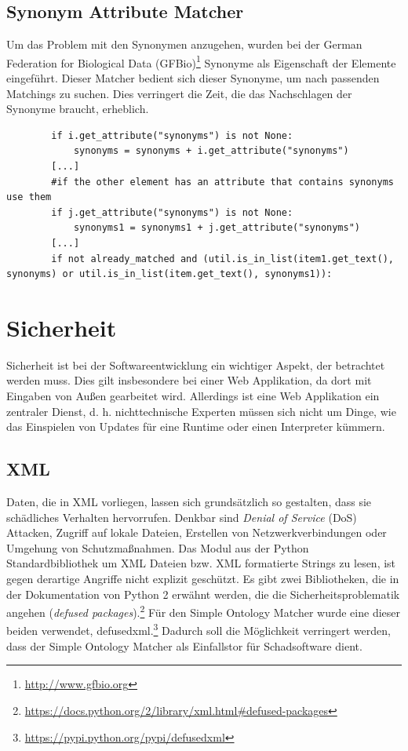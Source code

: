 		\subsection{Synonym Attribute Matcher}
		Um das Problem mit den Synonymen anzugehen, wurden bei der German Federation
		for Biological Data (GFBio)\footnote{\url{http://www.gfbio.org}} Synonyme als
		Eigenschaft der Elemente eingeführt. Dieser Matcher bedient sich dieser
		Synonyme, um nach passenden Matchings zu suchen. Dies verringert die Zeit, die
		das Nachschlagen der Synonyme braucht, erheblich.
		\begin{lstlisting}
		if i.get_attribute("synonyms") is not None:
            synonyms = synonyms + i.get_attribute("synonyms")
        [...]
        #if the other element has an attribute that contains synonyms use them
        if j.get_attribute("synonyms") is not None:
            synonyms1 = synonyms1 + j.get_attribute("synonyms")
        [...]
        if not already_matched and (util.is_in_list(item1.get_text(), synonyms) or util.is_in_list(item.get_text(), synonyms1)):
		\end{lstlisting}
		
		\section{Sicherheit}
		\label{Sicherheit}
		Sicherheit ist bei der Softwareentwicklung ein wichtiger Aspekt, der
		betrachtet werden muss. Dies gilt insbesondere bei einer Web Applikation, da
		dort mit Eingaben von Außen gearbeitet wird. Allerdings ist eine Web
		Applikation ein zentraler Dienst, d. h. nichttechnische Experten müssen sich
		nicht um Dinge, wie das Einspielen von Updates für eine Runtime oder einen
		Interpreter kümmern.
		
		\subsection{XML}
		Daten, die in XML vorliegen, lassen sich grundsätzlich so gestalten, dass sie
		schädliches Verhalten hervorrufen. Denkbar sind
		\textit{Denial of Service} (DoS) Attacken, Zugriff auf lokale Dateien,
		Erstellen von Netzwerkverbindungen oder Umgehung von
		Schutzmaßnahmen.\cite{defusedxml}
		Das Modul aus der Python Standardbibliothek um XML Dateien bzw. XML
		formatierte Strings zu lesen, ist gegen derartige Angriffe nicht explizit
		geschützt. Es gibt zwei Bibliotheken, die in der Dokumentation von Python 2
		erwähnt werden, die die Sicherheitsproblematik angehen (\textit{defused
		packages}).\footnote{\url{https://docs.python.org/2/library/xml.html#defused-packages}}
		Für den Simple Ontology Matcher wurde eine dieser beiden verwendet, defusedxml.\footnote{\url{https://pypi.python.org/pypi/defusedxml}} Dadurch
		soll die Möglichkeit verringert werden, dass der Simple Ontology Matcher als
		Einfallstor für Schadsoftware dient.
		
